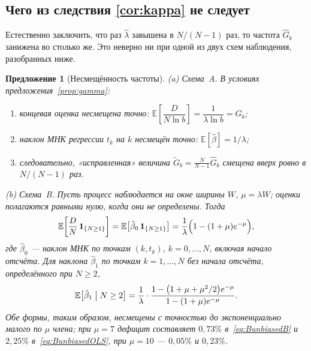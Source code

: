 \documentclass[11pt,a4paper]{article}
\theoremstyle{plain}
\newtheorem{proposition}{Предложение}
\theoremstyle{remark}
\begin{document}
\subsection{Чего из следствия \ref{cor:kappa} не следует}

Естественно заключить, что раз $\hat\lambda$ завышена в $N/(N-1)$ раз, то частота
$\hat G_b$ занижена во столько же. Это неверно ни при одной из двух схем наблюдения,
разобранных ниже.

\begin{proposition}[Несмещённость частоты]\label{prop:unbiased}
\emph{(a) Схема~A.} В условиях предложения~\ref{prop:gamma}:
\begin{enumerate}
\item[\rm(i)] концевая оценка несмещена точно:
$\mathbb E\!\left[\dfrac{D}{N\ln b}\right]=\dfrac{1}{\lambda\ln b}=G_b$;
\item[\rm(ii)] наклон МНК регрессии $t_k$ на $k$ несмещён точно:
$\mathbb E[\hat\beta]=1/\lambda$;
\item[\rm(iii)] следовательно, «исправленная» величина
$\tilde G_b=\frac{N}{N-1}\hat G_b$ смещена \emph{вверх} ровно в $N/(N-1)$ раз.
\end{enumerate}
\emph{(b) Схема~B.} Пусть процесс наблюдается на окне ширины $W$, $\mu=\lambda W$;
оценки полагаются равными нулю, когда они не определены. Тогда
\begin{equation}\label{eq:BunbiasedB}
\mathbb E\!\left[\frac{D}{N}\,\mathbf 1_{\{N\ge1\}}\right]
=\mathbb E\bigl[\hat\beta_0\,\mathbf 1_{\{N\ge1\}}\bigr]
=\frac{1}{\lambda}\Bigl(1-(1+\mu)e^{-\mu}\Bigr),
\end{equation}
где $\hat\beta_0$ --- наклон МНК по точкам $(k,t_k)$, $k=0,\dots,N$, \emph{включая}
начало отсчёта. Для наклона $\hat\beta_1$ по точкам $k=1,\dots,N$ \emph{без}
начала отсчёта, определённого при $N\ge2$,
\begin{equation}\label{eq:BunbiasedOLS}
\mathbb E\bigl[\hat\beta_1\bigm|N\ge2\bigr]
=\frac{1}{\lambda}\cdot
\frac{1-\bigl(1+\mu+\mu^2/2\bigr)e^{-\mu}}{1-(1+\mu)e^{-\mu}} .
\end{equation}
Обе формы, таким образом, несмещены с точностью до экспоненциально малого по
$\mu$ члена; при $\mu=7$ дефицит составляет $0{,}73\%$ в~\eqref{eq:BunbiasedB} и
$2{,}25\%$ в~\eqref{eq:BunbiasedOLS}, при $\mu=10$ --- $0{,}05\%$ и $0{,}23\%$.
\end{proposition}
\end{document}
